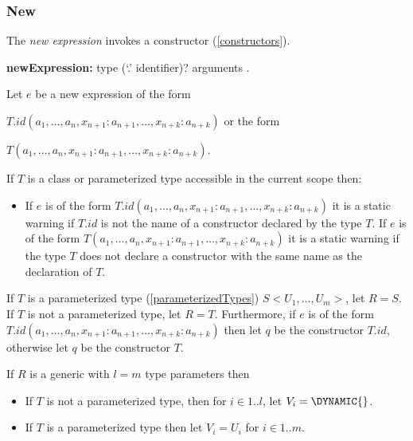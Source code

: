 \documentclass{article}
\begin{document}
\subsubsection{ New}

\LMHash{}
The {\em new expression} invokes a constructor (\ref{constructors}).

\begin{grammar}
{\bf newExpression:}
\NEW{} type (`{\escapegrammar .}' identifier)? arguments
.
\end{grammar}

\LMHash{}
Let $e$ be a new expression of the form

\NEW{} $T.id(a_1, \ldots , a_n, x_{n+1}: a_{n+1}, \ldots , x_{n+k}: a_{n+k})$ or the form

\NEW{} $T(a_1, \ldots , a_n, x_{n+1}: a_{n+1}, \ldots , x_{n+k}: a_{n+k})$.



\LMHash{}
If $T$ is  a class or parameterized type accessible in the current scope then:
\begin{itemize}
\item
If $e$ is of the form \NEW{} $T.id(a_1, \ldots , a_n, x_{n+1}: a_{n+1}, \ldots , x_{n+k}: a_{n+k})$ it is a static warning if $T.id$ is not the name of a constructor declared by the type $T$. If $e$ is of the form  \NEW{} $T(a_1, \ldots , a_n, x_{n+1}: a_{n+1}, \ldots , x_{n+k}: a_{n+k})$ it is a static warning if the type $T$ does not declare a constructor with the same name as the declaration of $T$.
\end{itemize}

\LMHash{}
If $T$ is a parameterized type (\ref{parameterizedTypes}) $S<U_1,  \ldots, U_m>$, let $R = S$.
If $T$ is not a parameterized type, let $R = T$.
Furthermore, if $e$ is of the form \NEW{} $T.id(a_1, \ldots , a_n, x_{n+1}: a_{n+1}, \ldots , x_{n+k}: a_{n+k})$ then let  $q$ be the constructor  $T.id$, otherwise let $q$ be the constructor $T$.

\LMHash{}
If $R$ is a generic with $l = m$ type parameters then
\begin{itemize}
\item  If $T$ is not a parameterized type, then for $ i \in 1 .. l$, let $V_i =  \DYNAMIC{}$.
\item  If $T$ is  a parameterized type then let $V_i = U_i$ for $ i \in 1 .. m$.
\end{itemize}
\end{document}
